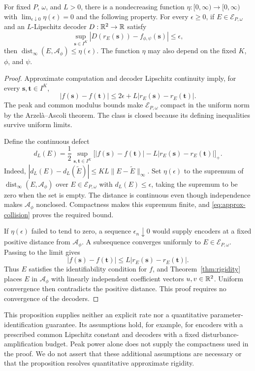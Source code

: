 \begin{proposition}
\label{prop:approx-rigidity}
For fixed $P$, $\omega$, and $L>0$, there is a nondecreasing function $\eta:[0,\infty)\to[0,\infty)$ with $\lim_{\epsilon\downarrow0}\eta(\epsilon)=0$ and the following property. For every $\epsilon\ge0$, if $E\in\mathcal E_{P,\omega}$ and an $L$-Lipschitz decoder $D:\mathbb R^2\to\mathbb R$ satisfy
$$
 \sup_{\mathbf s\in I^K}
 |D(r_E(\mathbf s))-f_{\phi,\psi}(\mathbf s)|\le\epsilon,
$$
then $\operatorname{dist}_\infty(E,\mathcal A_\phi)\le\eta(\epsilon)$. The function $\eta$ may also depend on the fixed $K$, $\phi$, and $\psi$.
\end{proposition}
\begin{proof}
Approximate computation and decoder Lipschitz continuity imply, for every $\mathbf s,\mathbf t\in I^K$,
\begin{equation}
 |f(\mathbf s)-f(\mathbf t)|
 \le 2\epsilon+L|r_E(\mathbf s)-r_E(\mathbf t)|.
 \label{eq:approx-collision}
\end{equation}
The peak and common modulus bounds make $\mathcal E_{P,\omega}$ compact in the uniform norm by the Arzel\`a--Ascoli theorem. The class is closed because its defining inequalities survive uniform limits.

Define the continuous defect
$$
 d_L(E)=\frac12\sup_{\mathbf s,\mathbf t\in I^K}
 \bigl[|f(\mathbf s)-f(\mathbf t)|
       -L|r_E(\mathbf s)-r_E(\mathbf t)|\bigr]_+.
$$
Indeed, $|d_L(E)-d_L(\widetilde E)|\le KL\|E-\widetilde E\|_\infty$. Set $\eta(\epsilon)$ to the supremum of $\operatorname{dist}_\infty(E,\mathcal A_\phi)$ over $E\in\mathcal E_{P,\omega}$ with $d_L(E)\le\epsilon$, taking the supremum to be zero when the set is empty. The distance is continuous even though independence makes $\mathcal A_\phi$ nonclosed. Compactness makes this supremum finite, and \eqref{eq:approx-collision} proves the required bound.

If $\eta(\epsilon)$ failed to tend to zero, a sequence $\epsilon_n\downarrow0$ would supply encoders at a fixed positive distance from $\mathcal A_\phi$. A subsequence converges uniformly to $E\in\mathcal E_{P,\omega}$. Passing to the limit gives
$$
 |f(\mathbf s)-f(\mathbf t)|
 \le L|r_E(\mathbf s)-r_E(\mathbf t)|.
$$
Thus $E$ satisfies the identifiability condition for $f$, and Theorem~\ref{thm:rigidity} places $E$ in $\mathcal A_\phi$ with linearly independent coefficient vectors $u,v\in\mathbb R^2$. Uniform convergence then contradicts the positive distance. This proof requires no convergence of the decoders.
\end{proof}

This proposition supplies neither an explicit rate nor a quantitative parameter-identification guarantee. Its assumptions hold, for example, for encoders with a prescribed common Lipschitz constant and decoders with a fixed disturbance-amplification budget. Peak power alone does not supply the compactness used in the proof. We do not assert that these additional assumptions are necessary or that the proposition resolves quantitative approximate rigidity.
